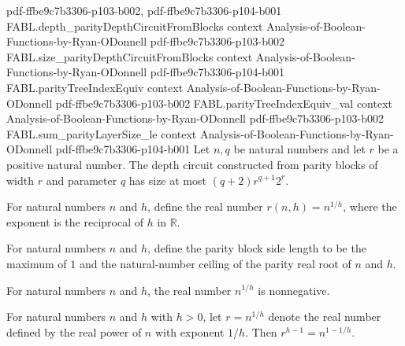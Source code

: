 \begin{theorem}
  {pdf-ffbe9c7b3306-p103-b002,
    pdf-ffbe9c7b3306-p104-b001}
\proofstep
  {FABL.depth_parityDepthCircuitFromBlocks}
  {context}
  {Analysis-of-Boolean-Functions-by-Ryan-ODonnell}
  {pdf-ffbe9c7b3306-p103-b002}
\proofstep
  {FABL.size_parityDepthCircuitFromBlocks}
  {context}
  {Analysis-of-Boolean-Functions-by-Ryan-ODonnell}
  {pdf-ffbe9c7b3306-p104-b001}
\proofstep
  {FABL.parityTreeIndexEquiv}
  {context}
  {Analysis-of-Boolean-Functions-by-Ryan-ODonnell}
  {pdf-ffbe9c7b3306-p103-b002}
\proofstep
  {FABL.parityTreeIndexEquiv_val}
  {context}
  {Analysis-of-Boolean-Functions-by-Ryan-ODonnell}
  {pdf-ffbe9c7b3306-p103-b002}
\proofstep
  {FABL.sum_parityLayerSize_le}
  {context}
  {Analysis-of-Boolean-Functions-by-Ryan-ODonnell}
  {pdf-ffbe9c7b3306-p104-b001}
Let $n,q$ be natural numbers and let $r$ be a positive natural number. The depth circuit
constructed from parity blocks of width $r$ and parameter $q$ has size at most
$(q+2)r^{q+1}2^r$.
\end{theorem}

\begin{definition}
\label{FABL.parityRealRoot}
\leanok
For natural numbers $n$ and $h$, define the real number $r(n,h)=n^{1/h}$, where the
exponent is the reciprocal of $h$ in $\mathbb{R}$.
\end{definition}

\begin{definition}
\label{FABL.parityBlockSide}
\leanok
{}
For natural numbers $n$ and $h$, define the parity block side length to be the maximum
of $1$ and the natural-number ceiling of the parity real root of $n$ and $h$.
\end{definition}

\begin{theorem}
\label{FABL.parityRealRoot_nonneg}
\leanok
{}
For natural numbers $n$ and $h$, the real number $n^{1/h}$ is nonnegative.
\end{theorem}

\begin{theorem}
\label{FABL.parityRealRoot_pow_pred}
\leanok
{}
For natural numbers $n$ and $h$ with $h>0$, let $r=n^{1/h}$ denote the real number
defined by the real power of $n$ with exponent $1/h$. Then $r^{h-1}=n^{1-1/h}$.
\end{theorem}

